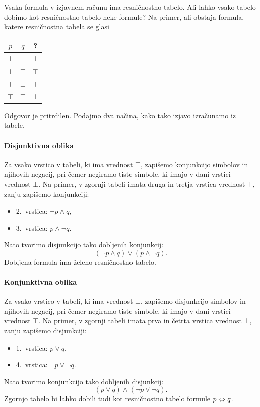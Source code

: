 Vsaka formula v izjavnem računu ima resničnostno tabelo. Ali lahko vsako tabelo
dobimo kot resničnostno tabelo neke formule? Na primer, ali obstaja formula,
katere resničnostna tabela se glasi
%
\begin{center}
  \begin{tabular}{ccc}
    \toprule
    $p$ & $q$ & ? \\ \midrule
    $\bot$ & $\bot$ & $\bot$ \\
    $\bot$ & $\top$ & $\top$ \\
    $\top$ & $\bot$ & $\top$ \\
    $\top$ & $\top$ & $\bot$ \\
    \bottomrule
  \end{tabular}
\end{center}
%
Odgovor je pritrdilen. Podajmo dva načina, kako tako izjavo izračunamo iz tabele.

\paragraph*{Disjunktivna oblika}

Za vsako vrstico v tabeli, ki ima vrednost $\top$, zapišemo konjunkcijo simbolov in
njihovih negacij, pri čemer negiramo tiste simbole, ki imajo v dani vrstici vrednost
$\bot$. Na primer, v zgornji tabeli imata druga in tretja vrstica vrednost $\top$, zanju
zapišemo konjunkciji:
%
\begin{itemize}
\item 2.~vrstica: $\neg p \land q$,
\item 3.~vrstica: $p \land \neg q$.
\end{itemize}
%
Nato tvorimo disjunkcijo tako dobljenih konjunkcij:
%
\begin{equation*}
  (\neg p \land q) \lor (p \land \neg q).
\end{equation*}
%
Dobljena formula ima želeno resničnostno tabelo.

\paragraph*{Konjunktivna oblika}

Za vsako vrstico v tabeli, ki ima vrednost $\bot$, zapišemo
disjunkcijo simbolov in njihovih negacij, pri čemer negiramo tiste simbole, ki
imajo v dani vrstici vrednost $\top$. Na primer, v zgornji tabeli imata prva in
četrta vrstica vrednost $\bot$, zanju zapišemo disjunkciji:
%
\begin{itemize}
\item 1.~vrstica: $p \lor q$,
\item 4.~vrstica: $\neg p \lor \neg q$.
\end{itemize}
%
Nato tvorimo konjunkcijo tako dobljenih disjunkcij:
%
\begin{equation*}
  (p \lor q) \land (\neg p \lor \neg q).
\end{equation*}
%
Zgornjo tabelo bi lahko dobili tudi kot resničnostno tabelo formule $p \Leftrightarrow q$.


